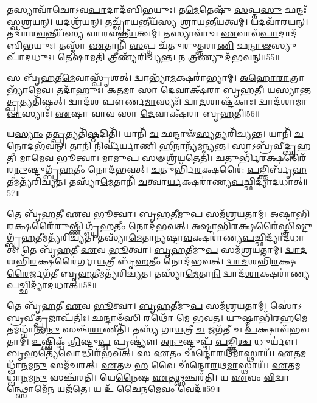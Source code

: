 𑌤𑌸𑍍𑌯𑌾𑌵𑌾᳴𑌚𑍋\-𑌽𑌵\-\ul{𑌪𑌾}\-𑌦𑌾𑌦᳴𑌬𑌿𑌭𑌯𑍁𑌃।
𑌤\-\ul{𑌮𑍇}\-𑌤𑍇𑌷𑍁᳴ \ul{𑌸}\-𑌪𑍍𑌤\-\ul{𑌸𑍁} 𑌛𑌨𑍍𑌦𑌃᳴ 𑌸𑍍𑌵𑌶𑍍𑌰𑌯𑌨𑍍।
𑌯𑌦𑌶𑍍𑌰᳴𑌯𑌨𑍍।
𑌤𑌚𑍍𑌛𑍍𑌰𑌾᳴\-\ul{𑌯}\-𑌨𑍍𑌤𑍀𑌯᳴𑌸𑍍𑌯 𑌶𑍍𑌰𑌾𑌯𑌨𑍍𑌤𑍀\-\ul{𑌯}\-𑌤𑍍𑌵𑌮𑍍।
𑌯𑌦𑌵𑌾᳴𑌰𑌯𑌨𑍍।
𑌤𑌦𑍍𑌵𑌾᳴𑌰\-\-\ul{𑌵}\-𑌨𑍍𑌤𑍀𑌯᳴𑌸𑍍𑌯 𑌵𑌾𑌰𑌵𑌨𑍍𑌤𑍀\-\ul{𑌯}\-𑌤𑍍𑌵𑌮𑍍।
𑌤𑌸𑍍𑌯𑌾𑌵𑌾᳴𑌚 \ul{𑌏}\-𑌵𑌾𑌵᳴\-\ul{𑌪𑌾}\-𑌦𑌾𑌦᳴𑌬𑌿𑌭𑌯𑍁𑌃।
𑌤𑌸𑍍𑌮𑌾᳴ \ul{𑌏}\-𑌤𑌾𑌨𑌿᳴ \ul{𑌸}\-𑌪𑍍𑌤 𑌚᳴𑌤𑍁𑌰𑍁\-\ul{𑌤𑍍𑌤}\-𑌰𑌾\-\ul{𑌣𑌿} 𑌛\-\ul{𑌨𑍍𑌦𑌾}\-\-\ul{𑍟}\-𑌸𑍍𑌯𑍁𑌪𑌾᳴𑌦𑌧𑍁𑌃।
𑌤𑍇\-\ul{𑌷𑌾}\-𑌮\-\ul{𑌤𑌿} 𑌤𑍍𑌰𑍀𑌣𑍍𑌯᳴𑌰𑌿𑌚𑍍𑌯𑌨𑍍𑌤।
𑌨 𑌤𑍍𑌰𑍀𑌣𑍍𑌯𑍁𑌦᳴\-𑌭𑌵𑌨𑍍॥55॥

𑌸 𑌬𑍃᳴\-\ul{𑌹}\-𑌤𑍀\-\ul{𑌮𑍇}\-𑌵𑌾𑌸𑍍𑌪𑍃᳴𑌶𑌤𑍍।
𑌦𑍍𑌵𑌾𑌭𑍍𑌯𑌾᳴\-\ul{𑌮}\-𑌕𑍍𑌷𑌰𑌾॑𑌭𑍍𑌯𑌾𑌮𑍍।
\-\ul{𑌅}\-\-\ul{𑌹𑍋}\-\-\ul{𑌰𑌾}\-𑌤𑍍𑌰𑌾𑌭𑍍𑌯𑌾᳴\-\ul{𑌮𑍇}\-𑌵।
𑌤𑌦𑌾᳴𑌹𑍁𑌃।
\-\ul{𑌕}\-\-\ul{𑌤}\-𑌮𑌾 𑌸𑌾 \ul{𑌦𑍇}\-𑌵𑌾𑌕𑍍𑌷᳴𑌰𑌾 𑌬𑍃\-\ul{𑌹}\-𑌤𑍀।
𑌯\-\ul{𑌸𑍍𑌯𑌾}\-𑌨𑍍𑌤\-\ul{𑌤𑍍𑌪𑍍𑌰}\-𑌤𑍍𑌯𑌤𑌿᳴𑌷𑍍𑌠𑌤𑍍।
𑌦𑍍𑌵𑌾𑌦᳴𑌶 𑌪𑍗𑌰𑍍𑌣\-\ul{𑌮𑌾}\-𑌸𑍍𑌯𑌃᳴।
𑌦𑍍𑌵𑌾\-\ul{𑌦}\-𑌶𑌾𑌷𑍍𑌟᳴𑌕𑌾𑌃।
𑌦𑍍𑌵𑌾𑌦᳴𑌶𑌾𑌮𑌾\-\ul{𑌵𑌾}\-𑌸𑍍𑌯𑌾𑌃॑।
\-\ul{𑌏}\-𑌷𑌾 𑌵𑌾𑌵 𑌸𑌾 \ul{𑌦𑍇}\-𑌵𑌾𑌕𑍍𑌷᳴𑌰𑌾 𑌬𑍃\-\ul{𑌹}\-𑌤𑍀॥56॥

𑌯\-\ul{𑌸𑍍𑌯𑌾𑌂} 𑌤\-\ul{𑌤𑍍𑌪𑍍𑌰}\-𑌤𑍍𑌯𑌤𑌿᳴\-\ul{𑌷𑍍𑌠}\-𑌦𑌿𑌤𑌿᳴।
𑌯𑌾𑌨𑌿᳴ \ul{𑌚} 𑌛𑌨𑍍𑌦𑌾𑍟᳴\-\ul{𑌸𑍍𑌯}\-𑌤𑍍𑌯𑌰𑌿᳴𑌚𑍍𑌯𑌨𑍍𑌤।
𑌯𑌾𑌨𑌿᳴ \ul{𑌚} 𑌨𑍋𑌦𑌭᳴𑌵𑌨𑍍।
𑌤𑌾\-\ul{𑌨𑌿} 𑌨𑌿𑌰𑍍𑌵𑍀॑𑌰𑍍𑌯𑌾𑌣𑌿 \ul{𑌹𑍀}\-𑌨𑌾𑌨𑍍𑌯᳴𑌮𑌨𑍍𑌯𑌨𑍍𑌤।
𑌸𑌾𑌽𑌬𑍍𑌰᳴𑌵𑍀𑌦𑍍𑌬𑍃\-\ul{𑌹}\-𑌤𑍀।
𑌮𑌾\-\ul{𑌮𑍇}\-𑌵 \ul{𑌭𑍂}\-𑌤𑍍𑌵𑌾।
𑌮𑌾𑌮𑍁\-\ul{𑌪} 𑌸𑍟𑌶𑍍𑌰᳴\-\ul{𑌯}\-𑌤𑍇𑌤𑌿᳴।
\-\ul{𑌚}\-𑌤𑍁𑌰𑍍𑌭𑌿᳴\-\ul{𑌰}\-𑌕𑍍𑌷𑌰𑍈᳴𑌰\-\ul{𑌨𑍁}\-\-𑌷𑍍𑌟𑍁𑌗𑍍𑌬𑍃᳴\-\ul{𑌹}\-𑌤𑍀𑌂 𑌨𑍋𑌦᳴𑌭𑌵𑌤𑍍।
\-\ul{𑌚}\-𑌤𑍁𑌰𑍍𑌭𑌿᳴\-\ul{𑌰}\-𑌕𑍍𑌷𑌰𑍈॑: \ul{𑌪}\-𑌙𑍍𑌕𑍍𑌤𑌿𑌰𑍍𑌬𑍃᳴\-\ul{𑌹}\-𑌤𑍀\-𑌮𑌤𑍍𑌯᳴𑌰𑌿𑌚𑍍𑌯𑌤।
𑌤𑌸𑍍𑌯𑌾᳴\-\ul{𑌮𑍇}\-𑌤𑌾𑌨𑌿᳴ \ul{𑌚}\-𑌤𑍍𑌵𑌾\-\ul{𑌰𑍍𑌯}\-𑌕𑍍𑌷𑌰𑌾॑𑌣𑍍𑌯\-\ul{𑌪}\-𑌚𑍍𑌛𑌿𑌦𑍍𑌯𑌾᳴\-𑌦𑌧𑌾𑌤𑍍॥57॥

𑌤𑍇 𑌬𑍃᳴\-\ul{𑌹}\-𑌤𑍀 \ul{𑌏}\-𑌵 \ul{𑌭𑍂}\-𑌤𑍍𑌵𑌾।
\-\ul{𑌬𑍃}\-\-\ul{𑌹}\-𑌤𑍀𑌮𑍁\-\ul{𑌪} 𑌸𑌮᳴𑌶𑍍𑌰𑌯𑌤𑌾𑌮𑍍।
\-\ul{𑌅}\-\-\ul{𑌷𑍍𑌟𑌾}\-𑌭𑌿\-\-\ul{𑌰}\-𑌕𑍍𑌷𑌰𑍈᳴\-\ul{𑌰𑍁}\-𑌷𑍍𑌣𑌿𑌗𑍍𑌬𑍃᳴\-\ul{𑌹}\-𑌤𑍀𑌂 𑌨𑍋𑌦᳴𑌭𑌵𑌤𑍍।
\-\ul{𑌅}\-\-\ul{𑌷𑍍𑌟𑌾}\-𑌭𑌿\-\-\ul{𑌰}\-𑌕𑍍𑌷𑌰𑍈॑\-\ul{𑌸𑍍𑌤𑍍𑌰𑌿}\-𑌷𑍍𑌟𑍁𑌗𑍍𑌬𑍃᳴\-\ul{𑌹}\-𑌤𑍀\-𑌮𑌤𑍍𑌯᳴\-𑌰𑌿𑌚𑍍𑌯𑌤।
𑌤𑌸𑍍𑌯𑌾᳴\-\ul{𑌮𑍇}\-𑌤𑌾\-\ul{𑌨𑍍𑌯}\-𑌷𑍍𑌟𑌾\-\ul{𑌵}\-𑌕𑍍𑌷𑌰𑌾॑𑌣𑍍𑌯\-\ul{𑌪}\-𑌚𑍍𑌛𑌿𑌦𑍍𑌯𑌾᳴\-𑌦𑌧𑌾𑌤𑍍।
𑌤𑍇 𑌬𑍃᳴\-\ul{𑌹}\-𑌤𑍀 \ul{𑌏}\-𑌵 \ul{𑌭𑍂}\-𑌤𑍍𑌵𑌾।
\-\ul{𑌬𑍃}\-\-\ul{𑌹}\-𑌤𑍀𑌮𑍁\-\ul{𑌪} 𑌸𑌮᳴𑌶𑍍𑌰𑌯𑌤𑌾𑌮𑍍।
\-\ul{𑌦𑍍𑌵𑌾}\-\-\ul{𑌦}\-𑌶𑌭𑌿᳴\-\ul{𑌰}\-𑌕𑍍𑌷𑌰𑍈॑𑌰𑍍𑌗𑌾\-\ul{𑌯}\-𑌤𑍍𑌰𑍀 𑌬𑍃᳴\-\ul{𑌹}\-𑌤𑍀𑌂 𑌨𑍋𑌦᳴𑌭𑌵𑌤𑍍।
\-\ul{𑌦𑍍𑌵𑌾}\-\-\ul{𑌦}\-𑌶𑌭𑌿᳴\-\ul{𑌰}\-𑌕𑍍𑌷\-\ul{𑌰𑍈}\-𑌰𑍍𑌜𑌗᳴𑌤𑍀 𑌬𑍃\-\ul{𑌹}\-𑌤𑍀𑌮𑌤𑍍𑌯᳴𑌰𑌿𑌚𑍍𑌯𑌤।
𑌤𑌸𑍍𑌯𑌾᳴\-\ul{𑌮𑍇}\-𑌤𑌾\-\ul{𑌨𑌿} 𑌦𑍍𑌵𑌾𑌦᳴\-\ul{𑌶𑌾}\-𑌕𑍍𑌷𑌰𑌾॑𑌣𑍍𑌯\-\ul{𑌪}\-𑌚𑍍𑌛𑌿𑌦𑍍𑌯𑌾᳴\-𑌦𑌧𑌾𑌤𑍍॥58॥

𑌤𑍇 𑌬𑍃᳴\-\ul{𑌹}\-𑌤𑍀 \ul{𑌏}\-𑌵 \ul{𑌭𑍂}\-𑌤𑍍𑌵𑌾।
\-\ul{𑌬𑍃}\-\-\ul{𑌹}\-𑌤𑍀𑌮𑍁\-\ul{𑌪} 𑌸𑌮᳴𑌶𑍍𑌰𑌯𑌤𑌾𑌮𑍍।
𑌸𑍋॑𑌽𑌬𑍍𑌰𑌵𑍀\-\ul{𑌤𑍍𑌪𑍍𑌰}\-𑌜𑌾\-𑌪᳴𑌤𑌿𑌃।
𑌛𑌨𑍍𑌦𑌾𑍞᳴\-\ul{𑌸𑌿} 𑌰𑌥𑍋᳴ 𑌮𑍇 𑌭𑌵𑌤।
\-\ul{𑌯𑍁}\-𑌷𑍍𑌮𑌾𑌭𑌿᳴\-\ul{𑌰}\-𑌹\-\ul{𑌮𑍇}\-𑌤𑌮𑌧𑍍𑌵𑌾᳴\-\ul{𑌨}\-𑌮\-\ul{𑌨𑍁} 𑌸𑌞𑍍𑌚᳴\-\ul{𑌰𑌾}\-𑌣𑍀𑌤𑌿᳴।
𑌤𑌸𑍍𑌯᳴ 𑌗𑌾\-\ul{𑌯}\-𑌤𑍍𑌰𑍀 \ul{𑌚} 𑌜𑌗᳴𑌤𑍀 𑌚 \ul{𑌪}\-𑌕𑍍𑌷𑌾𑌵᳴𑌭𑌵𑌤𑌾𑌮𑍍।
\-\ul{𑌉}\-𑌷𑍍𑌣𑌿𑌕𑍍𑌚᳴ \ul{𑌤𑍍𑌰𑌿}\-𑌷𑍍𑌟𑍁\-\ul{𑌪𑍍𑌚} 𑌪𑍍𑌰𑌷𑍍𑌟𑍍𑌯𑍗॑।
\-\ul{𑌅}\-\-\ul{𑌨𑍁}\-𑌷𑍍𑌟𑍁𑌪𑍍𑌚᳴ \ul{𑌪}\-𑌙𑍍𑌕𑍍𑌤𑌿\-\ul{𑌶𑍍𑌚} 𑌧𑍁𑌰𑍍𑌯𑍗॑।
\-\ul{𑌬𑍃}\-\-\ul{𑌹}\-𑌤𑍍𑌯𑍇᳴𑌵𑍋𑌦𑍍𑌧𑌿𑌰᳴𑌭𑌵𑌤𑍍।
𑌸 \ul{𑌏}\-𑌤𑌂 𑌛᳴𑌨𑍍𑌦𑍋\-\ul{𑌰}\-𑌥\-\ul{𑌮𑌾}\-𑌸𑍍𑌥𑌾𑌯᳴।
\-\ul{𑌏}\-𑌤𑌮𑌧𑍍𑌵𑌾᳴\-\ul{𑌨}\-𑌮\-\ul{𑌨𑍁} 𑌸𑌮᳴𑌚𑌰𑌤𑍍।
\-\ul{𑌏}\-𑌤𑍞 \ul{𑌹} 𑌵𑍈 𑌛᳴𑌨𑍍𑌦𑍋\-\ul{𑌰}\-𑌥\-\ul{𑌮𑌾}\-𑌸𑍍𑌥𑌾𑌯᳴।
\-\ul{𑌏}\-𑌤𑌮𑌧𑍍𑌵𑌾᳴\-\ul{𑌨}\-𑌮\-\ul{𑌨𑍁} 𑌸𑌞𑍍𑌚᳴𑌰𑌤𑌿।
𑌯𑍇\-\ul{𑌨𑍈}\-𑌷 \ul{𑌏}\-𑌤\-\ul{𑌥𑍍𑌸}\-𑌞𑍍𑌚𑌰᳴𑌤𑌿।
𑌯 \ul{𑌏}\-𑌵𑌂 \ul{𑌵𑌿}\-𑌦𑍍𑌵𑌾𑌨𑍍𑌥𑍍𑌸𑍋𑌮𑍇᳴\-\ul{𑌨} 𑌯𑌜᳴𑌤𑍇।
𑌯 𑌉᳴ 𑌚𑍈𑌨\-\ul{𑌮𑍇}\-𑌵𑌂 𑌵𑍇𑌦᳴॥59॥\anuvakamend[\-\ul{𑌅}\-\-\ul{𑌭}\-\-\ul{𑌵}\-𑌨𑍍𑌵𑌾𑌵 𑌸𑌾 \ul{𑌦𑍇}\-𑌵𑌾𑌕𑍍𑌷᳴𑌰𑌾 𑌬𑍃\-\ul{𑌹}\-𑌤𑍍𑌯᳴𑌦\-\ul{𑌧𑌾}\-𑌦𑍍𑌦𑍍𑌵𑌾𑌦᳴\-\ul{𑌶𑌾}\-𑌕𑍍𑌷𑌰𑌾॑𑌣𑍍𑌯\-\ul{𑌪}\-𑌚𑍍𑌛𑌿𑌦𑍍𑌯𑌾᳴𑌦𑌧𑌾\-\ul{𑌦𑌾}\-𑌸𑍍𑌥𑌾\-\ul{𑌯} 𑌷𑌟𑍍𑌚᳴]






